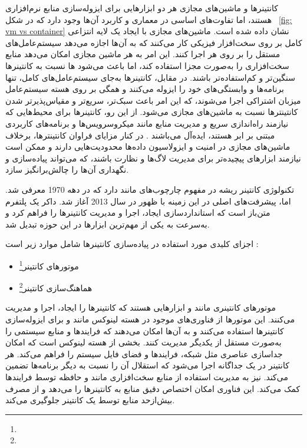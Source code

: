 کانتینرها و ماشین‌های مجازی هر دو ابزارهایی برای ایزوله‌سازی منابع نرم‌افزاری هستند، اما تفاوت‌های اساسی در معماری و کاربرد آن‌ها وجود دارد که در شکل
~\ref{fig: vm vs container}
نشان داده شده است. ماشین‌های مجازی با ایجاد یک لایه انتزاعی کامل بر روی سخت‌افزار فیزیکی کار می‌کنند که به آن‌ها اجازه می‌دهد سیستم‌عامل‌های مستقل را بر روی هر  اجرا کنند. این امر به هر ماشین مجازی امکان می‌دهد منابع سخت‌افزاری را به‌صورت مجزا استفاده کند، اما باعث می‌شود ‌ها نسبت به کانتینرها سنگین‌تر و کم‌استفاده‌تر باشند. در مقابل، کانتینرها به‌جای سیستم‌عامل‌های کامل، تنها برنامه‌ها و وابستگی‌های خود را ایزوله می‌کنند و همگی بر روی هسته سیستم‌عامل میزبان اشتراکی اجرا می‌شوند، که این امر باعث سبک‌تر، سریع‌تر و مقیاس‌پذیرتر شدن کانتینترها نسبت به ماشین‌های مجازی می‌شود. از این رو، کانتینرها برای محیط‌هایی که نیازمند راه‌اندازی سریع و مدیریت منابع مانند میکروسرویس‌ها و برنامه‌های کاربردی مبتنی بر ابر هستند، ایده‌آل می‌باشند \cite{Dockervm}. در کنار مزایای فراوان کانتینترها، برخلاف ماشین‌های مجازی در امنیت و ایزولاسیون داده‌ها محدودیت‌هایی دارند و ممکن است نیازمند ابزارهای پیچیده‌تر برای مدیریت لاگ‌ها و نظارت باشند، که می‌تواند پیاده‌سازی و نگهداری آن‌ها را چالش‌برانگیز سازد.

تکنولوژی کانتینر ریشه در مفهوم چارچوب‌های  مانند  دارد که در دهه 1970 معرفی شد. اما، پیشرفت‌های اصلی در این زمینه با ظهور  در سال 2013 آغاز شد. داکر یک پلتفرم متن‌باز است که استاندارد‌سازی ایجاد، اجرا و مدیریت کانتینرها را فراهم کرد و به‌سرعت به یکی از مهم‌ترین ابزارها در این حوزه تبدیل شد.

اجزای کلیدی مورد استفاده در پیاده‌سازی کانتینرها شامل موارد زیر است \cite{Docker2}:
\begin{itemize}
	\item 
	موتورهای کانتینر\footnote{}
	\item
	هماهنگ‌سازی کانتینر\footnote{}
\end{itemize}

موتورهای کانتینری مانند  و  ابزارهایی هستند که کانتینرها را ایجاد، اجرا و مدیریت می‌کنند. این موتورها از فناوری‌های موجود در هسته لینوکس مانند  و  برای ایزوله‌سازی کانتینرها استفاده می‌کنند و به آن‌ها امکان می‌دهند که فرایندها و منابع سیستمی را به‌صورت مستقل از یکدیگر مدیریت کنند.  بخشی از هسته لینوکس است که امکان جداسازی عناصری مثل شبکه، فرایندها و فضای فایل سیستم را فراهم می‌کند. هر کانتینر در یک  جداگانه اجرا می‌شود که استقلال آن را نسبت به دیگر برنامه‌ها تضمین می‌کند.  نیز به مدیریت استفاده از منابع سخت‌افزاری مانند  و حافظه توسط فرایندها کمک می‌کند. این فناوری امکان اختصاص دقیق منابع به کانتینرها را می‌دهد و از مصرف بیش‌ازحد منابع توسط یک کانتینر جلوگیری می‌کند.

